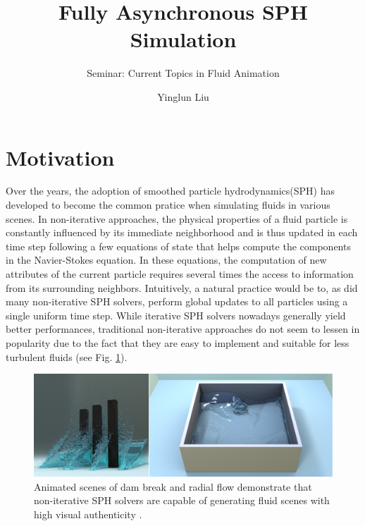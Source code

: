 \documentclass[
	11pt, 
	DIV10,
	ngerman,
	a4paper, 
	oneside, 
	headings=normal, 
	captions=tableheading,
	final, 
	numbers=noenddot
]{scrartcl}
\title{Fully Asynchronous SPH Simulation}
\subtitle{\vspace{0.5cm}Seminar: Current Topics in Fluid Animation}
\author{Yinglun Liu}
\begin{document}
\maketitle


\section{Motivation}

Over the years, the adoption of smoothed particle hydrodynamics(SPH) has developed to become the common pratice when simulating fluids in various scenes. In non-iterative approaches, the physical properties of a fluid particle is constantly influenced by its immediate neighborhood and is thus updated in each time step following a few equations of state that helps compute the components in the Navier-Stokes equation. In these equations, the computation of new attributes of the current particle requires several times the access to information from its surrounding neighbors. Intuitively, a natural practice would be to, as did many non-iterative SPH solvers, perform global updates to all particles using a single uniform time step. While iterative SPH solvers nowadays generally yield better performances, traditional non-iterative approaches do not seem to lessen in popularity due to the fact that they are easy to implement and suitable for less turbulent fluids (see Fig. \ref{fig1}).

\begin{figure}[tb]
	\centering
	\includegraphics[scale=0.26]{images/3}
	\caption{\label{fig1} Animated scenes of dam break and radial flow demonstrate that non-iterative SPH solvers are capable of generating fluid scenes with high visual authenticity \cite{reinhardt2017fully}.
	}
\end{figure}
\end{document}

